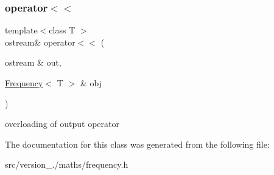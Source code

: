 \subsubsection{\texorpdfstring{operator$<$$<$}{operator<<}}
{\footnotesize\ttfamily template$<$class T $>$ \\
ostream\& operator$<$$<$ (\begin{DoxyParamCaption}\item[{ostream \&}]{out,  }\item[{\hyperlink{classez_1_1maths_1_1Frequency}{Frequency}$<$ T $>$ \&}]{obj }\end{DoxyParamCaption})\hspace{0.3cm}{\ttfamily [friend]}}

overloading of output operator 

The documentation for this class was generated from the following file\+:\begin{DoxyCompactItemize}
\item 
src/version\+\_./maths/frequency.\+h\end{DoxyCompactItemize}
